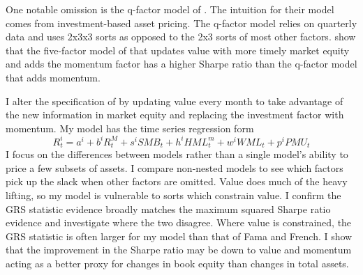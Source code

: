One notable omission is the q-factor model of \textcite{hou2015digesting}. The intuition
for their model comes from investment-based asset pricing. The q-factor model relies on
quarterly data and uses 2x3x3 sorts as opposed to the 2x3 sorts of most other factors.
\textcite{barillas2017model} show that the five-factor model of \textcite{fama2015five}
that updates value with more timely market equity and adds the momentum factor has a
higher Sharpe ratio than the q-factor model that adds momentum.

I alter the specification of \textcite{fama2015five} by updating value every month to take
advantage of the new information in market equity and replacing the investment factor with
momentum. My model has the time series regression form
\[
R_t^i=a^i+b^iR_t^M+s^iSMB_t+h^iHML_t^m+w^iWML_t+p^iPMU_t
\]
I focus on the differences between models rather than a single model’s ability to price a
few subsets of assets. I compare non-nested models to see which factors pick up the slack
when other factors are omitted. Value does much of the heavy lifting, so my model is
vulnerable to sorts which constrain value. I confirm the GRS statistic evidence broadly
matches the maximum squared Sharpe ratio evidence and investigate where the two disagree.
Where value is constrained, the GRS statistic is often larger for my model than that of
Fama and French. I show that the improvement in the Sharpe ratio may be down to value and
momentum acting as a better proxy for changes in book equity than changes in total assets.
